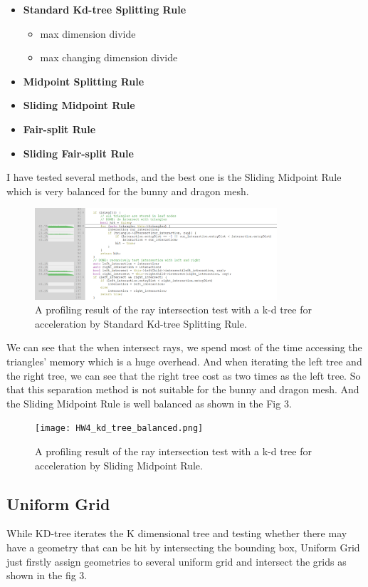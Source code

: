 \documentclass[acmtog]{acmart}
\begin{document}
	\begin{itemize}
		\item \textbf{Standard Kd-tree Splitting Rule}
		\begin{itemize}
			\item max dimension divide
			\item max changing dimension divide
		\end{itemize}
		\item \textbf{Midpoint Splitting Rule}
		\item \textbf{Sliding Midpoint Rule}
		\item \textbf{Fair-split Rule}
		\item \textbf{Sliding Fair-split Rule}
	\end{itemize}
	I have tested several methods, and the best one is the Sliding Midpoint Rule which is very balanced for the bunny and dragon mesh.
	\begin{figure}[h]
		\centering
		\includegraphics[width = 9cm]{HW4_kd_tree_raw.png}
		\caption{A profiling result of the ray intersection test with a k-d tree for acceleration by Standard Kd-tree Splitting Rule.}
	\end{figure}
	We can see that the when intersect rays, we spend most of the time accessing the triangles' memory which is a huge overhead.
	And when iterating the left tree and the right tree, we can see that the right tree cost as two times as the left tree.
	So that this separation method is not suitable for the bunny and dragon mesh.
	And the Sliding Midpoint Rule is well balanced as shown in the Fig 3.
	\begin{figure}[h]
		\centering
		\texttt{[image: HW4\_kd\_tree\_balanced.png]}
		\caption{A profiling result of the ray intersection test with a k-d tree for acceleration by Sliding Midpoint Rule.}
	\end{figure}

	\subsection{Uniform Grid}

	While KD-tree iterates the K dimensional tree and testing whether there may have a geometry that can be hit by intersecting the bounding box, Uniform Grid just firstly assign geometries to several uniform grid and intersect the grids as shown in the fig 3.
\end{document}

